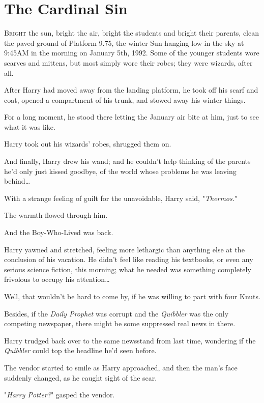 \chapter{The Cardinal Sin}

\lettrine{B}{right} the sun, 
bright the air, bright the students and bright their parents, clean the paved 
ground of Platform 9.75, the winter Sun hanging low in the sky at 9:45AM in the 
morning on January 5th, 1992. Some of the younger students wore scarves and 
mittens, but most simply wore their robes; they were wizards, after all.

After Harry had moved away from the landing platform, he took off his scarf and 
coat, opened a compartment of his trunk, and stowed away his winter things.

For a long moment, he stood there letting the January air bite at him, just to 
see what it was like.

Harry took out his wizards' robes, shrugged them on.

And finally, Harry drew his wand; and he couldn't help thinking of the parents 
he'd only just kissed goodbye, of the world whose problems he was leaving 
behind{\ldots}

With a strange feeling of guilt for the unavoidable, Harry said, 
"\emph{Thermos.}"

The warmth flowed through him.

And the Boy-Who-Lived was back.

Harry yawned and stretched, feeling more lethargic than anything else at the 
conclusion of his vacation. He didn't feel like reading his textbooks, or even 
any serious science fiction, this morning; what he needed was something 
completely frivolous to occupy his attention{\ldots}

Well, that wouldn't be hard to come by, if he was willing to part with four 
Knuts.

Besides, if the \emph{Daily Prophet} was corrupt and the \emph{Quibbler} was 
the only competing newspaper, there might be some suppressed real news in there.

Harry trudged back over to the same newsstand from last time, wondering if the 
\emph{Quibbler} could top the headline he'd seen before.

The vendor started to smile as Harry approached, and then the man's face 
suddenly changed, as he caught sight of the scar.

"\emph{Harry Potter?}" gasped the vendor.

